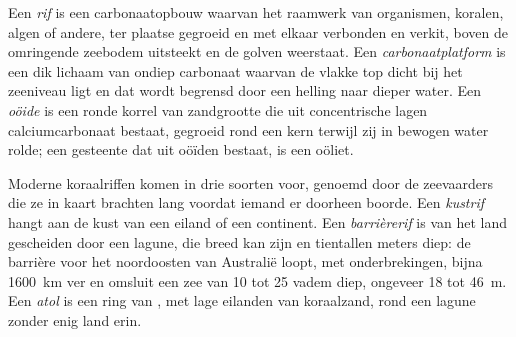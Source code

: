 \begin{definition}\label{def:b1:chemical-biogenic-sediments:reef}
Een \emph{rif} is een carbonaatopbouw waarvan het raamwerk van organismen, koralen, algen of andere, ter plaatse gegroeid en met elkaar verbonden en verkit, boven de omringende zeebodem uitsteekt en de golven weerstaat. Een \emph{carbonaatplatform} is een dik lichaam van ondiep carbonaat waarvan de vlakke top dicht bij het zeeniveau ligt en dat wordt begrensd door een helling naar dieper water. Een \emph{oöide} is een ronde korrel van zandgrootte die uit concentrische lagen calciumcarbonaat bestaat, gegroeid rond een kern terwijl zij in bewogen water rolde; een gesteente dat uit oöïden bestaat, is een oöliet.
\end{definition}

Moderne koraalriffen komen in drie soorten voor, genoemd door de zeevaarders die ze in kaart brachten lang voordat iemand er doorheen boorde. Een \emph{kustrif} hangt aan de kust van een eiland of een continent. Een \emph{barrièrerif} is van het land gescheiden door een lagune, die breed kan zijn en tientallen meters diep: de barrière voor het noordoosten van Australië loopt, met onderbrekingen, bijna \qty{1600}{km} ver en omsluit een zee van 10 tot 25 vadem diep, ongeveer 18 tot \qty{46}{m}. Een \emph{atol} is een ring van , met lage eilanden van koraalzand, rond een lagune zonder enig land erin.

